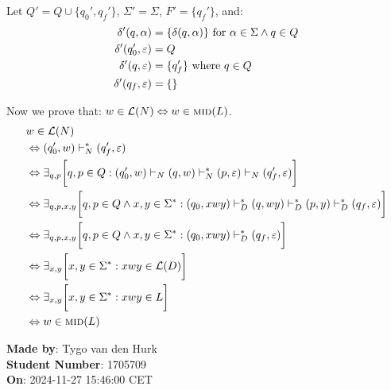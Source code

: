 \documentclass[a4paper]{article}
\begin{document}
        \bigskip
        
        Let $Q' = Q \cup \{ q_0', q_f' \}$, $\Sigma' = \Sigma$, $F' = \{ q_f' \}$, and:
        \begin{align}
               \delta'(q, \alpha) &= \{ \delta(q, \alpha) \} \text{ for } \alpha\in\Sigma \wedge q \in Q
            \\ \delta'(q_0', \varepsilon) &= Q 
            \\ \delta'(q, \varepsilon) &= \{ q_f' \} \text{ where }q \in Q
            \\ \delta'(q_f, \varepsilon) &= \{ \}
        \end{align}
        
        Now we prove that: $w\in\mathcal{L}(N) \Leftrightarrow w\in\textsc{mid}(L)$.
        \begin{align}
            &w\in\mathcal{L}(N)
            \\&\Leftrightarrow (q_0', w)\vdash^*_N(q_f', \varepsilon)
            \\&\Leftrightarrow \exists_{q, p}\bigg[ 
                q, p \in Q :
                (q_0', w) \vdash_N (q, w) \vdash_N^* (p, \varepsilon) \vdash_N (q_f', \varepsilon) 
            \bigg]
            \\&\Leftrightarrow \exists_{q, p, x, y}\bigg[ 
                q, p \in Q \wedge x, y \in \Sigma^* :
                (q_0, xwy) \vdash_D^* (q, wy) \vdash_D^* (p, y) \vdash_D^* (q_f, \varepsilon) 
            \bigg]
            \\&\Leftrightarrow \exists_{q, p, x, y}\bigg[ 
                q, p \in Q \wedge x, y \in \Sigma^* :
                (q_0, xwy) \vdash_D^* (q_f, \varepsilon) 
            \bigg]
            \\&\Leftrightarrow \exists_{x, y}\bigg[ 
                x, y \in \Sigma^* : 
                xwy \in \mathcal{L}(D)
            \bigg]
            \\&\Leftrightarrow \exists_{x, y}\bigg[ 
                x, y \in \Sigma^* : 
                xwy \in L
            \bigg]
            \\&\Leftrightarrow w\in\textsc{mid}(L)    
        \end{align}

    \bigskip
    
    \textbf{Made by}: Tygo van den Hurk \\
    \textbf{Student Number}: 1705709 \\
    \textbf{On}: 2024-11-27 15:46:00 CET \\
\end{document}
